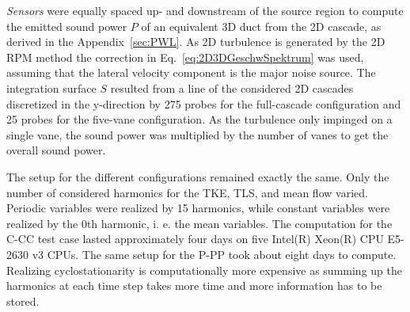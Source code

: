 \begin{description}
\item{\textit{Sensors}} were equally spaced up- and downstream of the source region to compute the emitted sound power $P$ of an equivalent 3D duct from the 2D cascade, as derived in the Appendix~\ref{sec:PWL}. As 2D turbulence is generated by the 2D RPM method the correction in Eq.~\ref{eq:2D3DGeschwSpektrum} was used, assuming that the lateral velocity component is the major noise source. The integration surface $S$ resulted from a line of the considered 2D cascades discretized in the y-direction by 275 probes for the full-cascade configuration and 25 probes for the five-vane configuration. As the turbulence only impinged on a single vane, the sound power was multiplied by the number of vanes to get the overall sound power.
\end{description}
The setup for the different configurations remained exactly the same.  Only the number of considered harmonics for the TKE, TLS, and mean flow varied.  Periodic variables were realized by 15 harmonics, while constant variables were realized by the 0th harmonic, i. e. the mean variables.  The computation for the C-CC test case lasted approximately four days on five Intel(R) Xeon(R) CPU E5-2630 v3 CPUs.  The same setup for the P-PP took about eight days to compute.  Realizing cyclostationarity is computationally more expensive as summing up the harmonics at each time step takes more time and more information has to be stored.        
